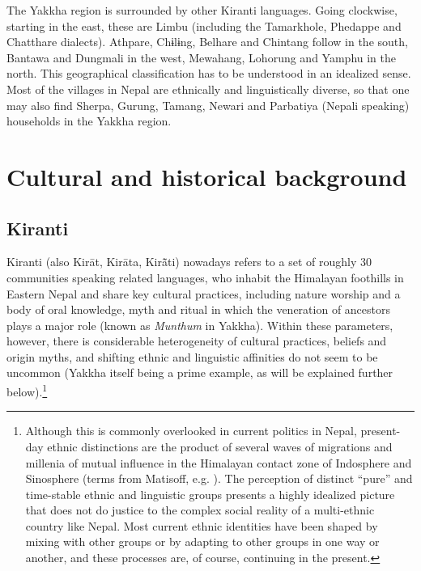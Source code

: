 The Yakkha region is surrounded by other Kiranti languages. Going clockwise, starting in the east, these are Limbu (including the Tamarkhole, Phedappe  and Chatthare dialects). Athpare,  Chɨlɨng, Belhare and Chintang follow in the south, Bantawa and Dungmali in the west, Mewahang, Lohorung and Yamphu in the north. This geographical classification has to be understood in an idealized sense. Most of the villages in Nepal are ethnically and linguistically diverse, so that one may also find Sherpa, Gurung, Tamang, Newari and Parbatiya (Nepali speaking) households in the Yakkha region.

  

\section{Cultural and historical background}\label{cult-hist}

\subsection{Kiranti}

 
Kiranti (also Kirāt, Kirāta, Kirā̃ti) nowadays refers to a set of roughly 30 communities speaking related languages, who inhabit the Himalayan foothills in Eastern Nepal and share key cultural practices, including nature worship and a body of oral knowledge, myth and ritual in which the veneration of ancestors plays a major role (known as \emph{Munthum} in Yakkha). Within these parameters, however, there is considerable heterogeneity of cultural practices, beliefs and origin myths, and shifting ethnic and linguistic affinities do not seem to be uncommon (Yakkha itself being a prime example, as will be explained further below).\footnote{Although this is commonly overlooked in current politics in Nepal,  present-day ethnic distinctions are the product of several waves of migrations and millenia of mutual influence in the Himalayan contact zone of Indosphere and Sinosphere (terms from Matisoff, e.g. \citealt{Matisoff1990_On}). The perception of distinct “pure” and time-stable ethnic and linguistic groups presents a highly idealized picture that does not do justice to the complex social reality of a multi-ethnic country like Nepal. Most current ethnic identities have been shaped by mixing with other groups or by adapting to other groups in one way or another, and these processes are, of course, continuing in the present.} 

